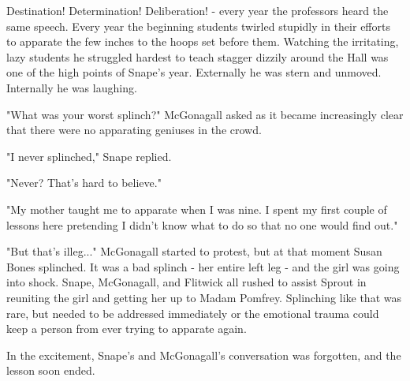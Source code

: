 \documentclass[a4paper,11pt]{article}
\begin{document}
Destination! Determination! Deliberation! - every year the professors heard the same speech. Every year the beginning students twirled stupidly in their efforts to apparate the few inches to the hoops set before them. Watching the irritating, lazy students he struggled hardest to teach stagger dizzily around the Hall was one of the high points of Snape's year. Externally he was stern and unmoved. Internally he was laughing.

"What was your worst splinch?" McGonagall asked as it became increasingly clear that there were no apparating geniuses in the crowd.

"I never splinched," Snape replied.

"Never? That's hard to believe."

"My mother taught me to apparate when I was nine. I spent my first couple of lessons here pretending I didn't know what to do so that no one would find out."

"But that's illeg..." McGonagall started to protest, but at that moment Susan Bones splinched. It was a bad splinch - her entire left leg - and the girl was going into shock. Snape, McGonagall, and Flitwick all rushed to assist Sprout in reuniting the girl and getting her up to Madam Pomfrey. Splinching like that was rare, but needed to be addressed immediately or the emotional trauma could keep a person from ever trying to apparate again.

In the excitement, Snape's and McGonagall's conversation was forgotten, and the lesson soon ended.
\end{document}
